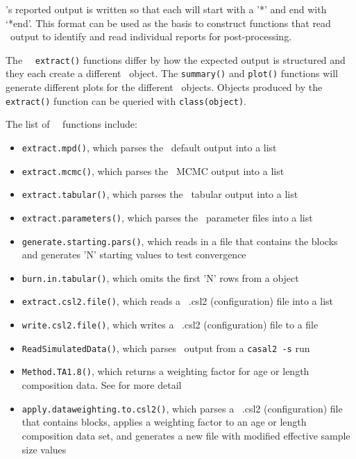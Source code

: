 \CNAME's reported output is written so that each  will start with a '*' and end with `*end'. This format can be used as the basis to construct functions that read \CNAME\ output to identify and read individual reports for post-processing.

The \CNAME\ \R\ \texttt{extract()} functions differ by how the expected output is structured and they each create a different \cname\ object. The \texttt{summary()} and \texttt{plot()} functions will generate different plots for the different \cname\ objects. Objects produced by the \texttt{extract()} function can be queried with \texttt{class(object)}.

The list of \cname\ \R\ functions include:

\begin{itemize}
	\item \texttt{extract.mpd()}, which parses the \CNAME\ default output into a list
	\item \texttt{extract.mcmc()}, which parses the \CNAME\ MCMC output into a list
	\item \texttt{extract.tabular()}, which parses the \CNAME\ tabular output into a list
	\item \texttt{extract.parameters()}, which parses the \CNAME\ parameter files into a list
	\item \texttt{generate.starting.pars()}, which reads in a file that contains the  blocks and generates 'N' starting values to test convergence
	\item \texttt{burn.in.tabular()}, which omits the first 'N' rows from a  object
	\item \texttt{extract.csl2.file()}, which reads a \CNAME\ .csl2 (configuration) file into a list
	\item \texttt{write.csl2.file()}, which writes a \CNAME\ .csl2 (configuration) file to a file
	\item \texttt{ReadSimulatedData()}, which parses \CNAME\ output from a \texttt{casal2 -s} run
	\item \texttt{Method.TA1.8()}, which returns a weighting factor for age or length composition data. See \cite{francis2011data} for more detail
	\item \texttt{apply.dataweighting.to.csl2()}, which parses a \CNAME\ .csl2 (configuration) file that contains  blocks, applies a weighting factor to an age or length composition data set, and generates a new  file with modified effective sample size values
\end{itemize}

